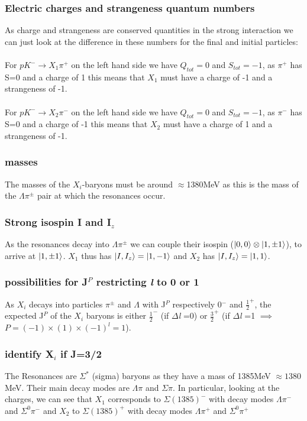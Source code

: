 \documentclass[10pt,a4paper,twoside]{article}
\begin{document}
\subsubsection*{Electric charges and strangeness quantum numbers}
As charge and strangeness are conserved quantities in the strong interaction we can just look at the difference in these numbers for the final and initial particles:\\\\
For $pK^-\rightarrow X_1\pi^+$ on the left hand side we have $Q_{tot}=0$ and $S_{tot} = -1$, as $\pi^+$ has S=0 and a charge of 1 this means that $X_1$ must have a charge of -1 and a strangeness of -1.
\\\\
For $pK^-\rightarrow X_2\pi^-$ on the left hand side we have $Q_{tot}=0$ and $S_{tot} = -1$, as $\pi^-$ has S=0 and a charge of -1 this means that $X_2$ must have a charge of 1 and a strangeness of -1.
\subsubsection*{masses}
The masses of the $X_i$-baryons must be around $\approx$1380MeV as this is the mass of the $\Lambda\pi^{\pm}$ pair at which the resonances occur.
\subsubsection*{Strong isospin I and I$_z$}
As the resonances decay into $\Lambda\pi^{\pm}$ we can couple their isospin ($\ket{0,0}\otimes\ket{1,\pm1}$),  to arrive at $\ket{1,\pm1}$. $X_1$ thus has $\ket{I,I_z} = \ket{1,-1}$ and $X_2$ has $\ket{I,I_z} = \ket{1,1}$.
\subsubsection*{possibilities for J$^P$ restricting \textit{l} to 0 or 1}
As $X_i$ decays into particles $\pi^{\pm}$ and $\Lambda$ with J$^P$ respectively 0$^-$ and $\frac{1}{2}^+$, the expected J$^P$ of the $X_i$ baryons is either $\frac{1}{2}^-$ (if $\Delta$\textit{l} =0) or $\frac{3}{2}^+$ (if $\Delta$\textit{l} =1 $\implies$ $P = (-1)\times(1)\times(-1)^\textit{l} = 1$).
\subsubsection*{identify X$_i$ if J=3/2}
The Resonances are $\Sigma^*$ (sigma) baryons as they have a mass of 1385MeV $\approx 1380$MeV. Their main decay modes are $\Lambda\pi$ and $\Sigma\pi$. In particular, looking at the charges, we can see that $X_1$ corresponds to $\Sigma(1385)^-$ with decay modes $\Lambda\pi^-$ and $\Sigma^0\pi^-$ and $X_2$ to $\Sigma(1385)^+$ with decay modes $\Lambda\pi^+$ and $\Sigma^0\pi^+$


\end{document}

